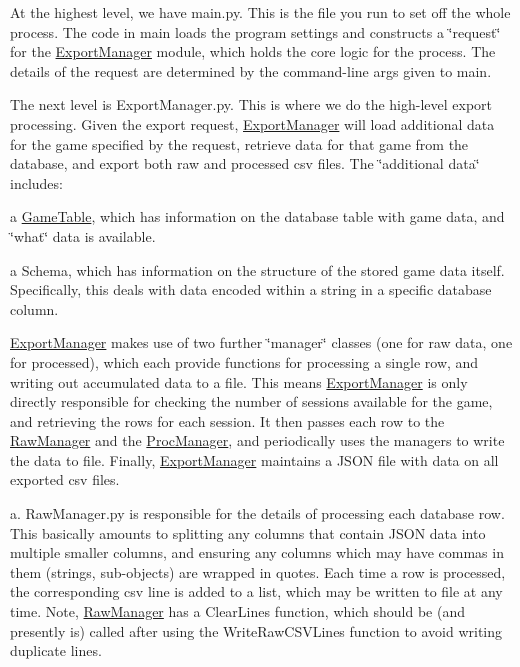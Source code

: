 \begin{DoxyEnumerate}
\item At the highest level, we have main.\+py. This is the file you run to set off the whole process. The code in main loads the program settings and constructs a \char`\"{}request\char`\"{} for the \mbox{\hyperlink{class_export_manager}{Export\+Manager}} module, which holds the core logic for the process. The details of the request are determined by the command-\/line args given to main.
\item The next level is Export\+Manager.\+py. This is where we do the high-\/level export processing. Given the export request, \mbox{\hyperlink{class_export_manager}{Export\+Manager}} will load additional data for the game specified by the request, retrieve data for that game from the database, and export both raw and processed csv files. The \char`\"{}additional data\char`\"{} includes\+:
\begin{DoxyItemize}
\item a \mbox{\hyperlink{class_game_table}{Game\+Table}}, which has information on the database table with game data, and \char`\"{}what\char`\"{} data is available.
\item a Schema, which has information on the structure of the stored game data itself. Specifically, this deals with data encoded within a string in a specific database column.
\end{DoxyItemize}

\mbox{\hyperlink{class_export_manager}{Export\+Manager}} makes use of two further \char`\"{}manager\char`\"{} classes (one for raw data, one for processed), which each provide functions for processing a single row, and writing out accumulated data to a file. This means \mbox{\hyperlink{class_export_manager}{Export\+Manager}} is only directly responsible for checking the number of sessions available for the game, and retrieving the rows for each session. It then passes each row to the \mbox{\hyperlink{class_raw_manager}{Raw\+Manager}} and the \mbox{\hyperlink{class_proc_manager}{Proc\+Manager}}, and periodically uses the managers to write the data to file. Finally, \mbox{\hyperlink{class_export_manager}{Export\+Manager}} maintains a J\+S\+ON file with data on all exported csv files.
\item a. Raw\+Manager.\+py is responsible for the details of processing each database row. This basically amounts to splitting any columns that contain J\+S\+ON data into multiple smaller columns, and ensuring any columns which may have commas in them (strings, sub-\/objects) are wrapped in quotes. Each time a row is processed, the corresponding csv line is added to a list, which may be written to file at any time. Note, \mbox{\hyperlink{class_raw_manager}{Raw\+Manager}} has a Clear\+Lines function, which should be (and presently is) called after using the Write\+Raw\+C\+S\+V\+Lines function to avoid writing duplicate lines.
\end{DoxyEnumerate}
